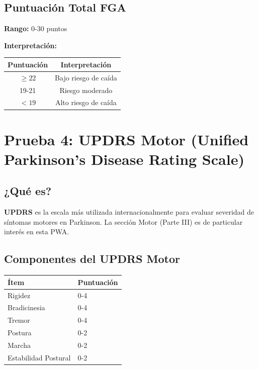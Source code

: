 \documentclass[12pt,a4paper,spanish,oneside]{book}
\begin{document}
\subsection{Puntuación Total FGA}

\textbf{Rango:} 0-30 puntos

\textbf{Interpretación:}

\begin{table}[h]
  \centering
  \begin{tabular}{|c|c|}
    \hline
    \textbf{Puntuación} & \textbf{Interpretación} \\
    \hline
    $\geq 22$ & Bajo riesgo de caída \\
    \hline
    19-21 & Riesgo moderado \\
    \hline
    $< 19$ & Alto riesgo de caída \\
    \hline
  \end{tabular}
\end{table}

\section{Prueba 4: UPDRS Motor (Unified Parkinson's Disease Rating Scale)}

\subsection{¿Qué es?}

\textbf{UPDRS} es la escala más utilizada internacionalmente para evaluar severidad de síntomas motores en Parkinson. La sección Motor (Parte III) es de particular interés en esta PWA.

\subsection{Componentes del UPDRS Motor}

\begin{table}[h]
  \centering
  \begin{tabular}{|p{6cm}|p{4cm}|}
    \hline
    \textbf{Ítem} & \textbf{Puntuación} \\
    \hline
    Rigidez & 0-4 \\
    \hline
    Bradicinesia & 0-4 \\
    \hline
    Tremor & 0-4 \\
    \hline
    Postura & 0-2 \\
    \hline
    Marcha & 0-2 \\
    \hline
    Estabilidad Postural & 0-2 \\
    \hline
  \end{tabular}
\end{table}
\end{document}
